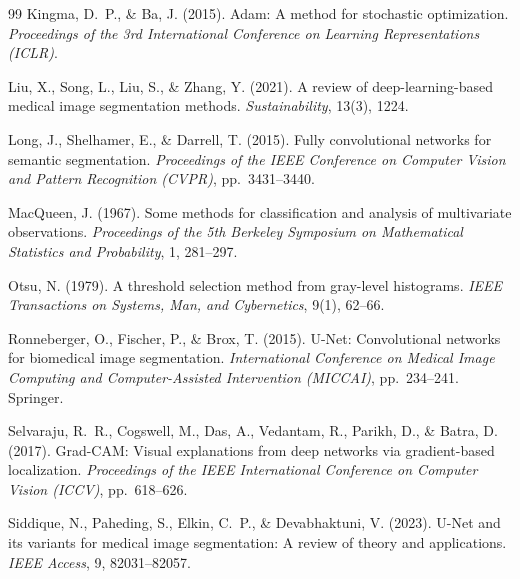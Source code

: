 \documentclass[12pt,a4paper]{article}
\begin{document}
\begin{thebibliography}{99}
Kingma, D.~P., \& Ba, J. (2015).
\newblock Adam: A method for stochastic optimization.
\newblock \textit{Proceedings of the 3rd International Conference on Learning Representations (ICLR)}.

Liu, X., Song, L., Liu, S., \& Zhang, Y. (2021).
\newblock A review of deep-learning-based medical image segmentation methods.
\newblock \textit{Sustainability}, 13(3), 1224.

Long, J., Shelhamer, E., \& Darrell, T. (2015).
\newblock Fully convolutional networks for semantic segmentation.
\newblock \textit{Proceedings of the IEEE Conference on Computer Vision and Pattern Recognition (CVPR)}, pp.~3431--3440.

MacQueen, J. (1967).
\newblock Some methods for classification and analysis of multivariate observations.
\newblock \textit{Proceedings of the 5th Berkeley Symposium on Mathematical Statistics and Probability}, 1, 281--297.

Otsu, N. (1979).
\newblock A threshold selection method from gray-level histograms.
\newblock \textit{IEEE Transactions on Systems, Man, and Cybernetics}, 9(1), 62--66.

Ronneberger, O., Fischer, P., \& Brox, T. (2015).
\newblock U-Net: Convolutional networks for biomedical image segmentation.
\newblock \textit{International Conference on Medical Image Computing and Computer-Assisted Intervention (MICCAI)}, pp.~234--241. Springer.

Selvaraju, R.~R., Cogswell, M., Das, A., Vedantam, R., Parikh, D., \& Batra, D. (2017).
\newblock Grad-CAM: Visual explanations from deep networks via gradient-based localization.
\newblock \textit{Proceedings of the IEEE International Conference on Computer Vision (ICCV)}, pp.~618--626.

Siddique, N., Paheding, S., Elkin, C.~P., \& Devabhaktuni, V. (2023).
\newblock U-Net and its variants for medical image segmentation: A review of theory and applications.
\newblock \textit{IEEE Access}, 9, 82031--82057.

\end{thebibliography}
\end{document}
